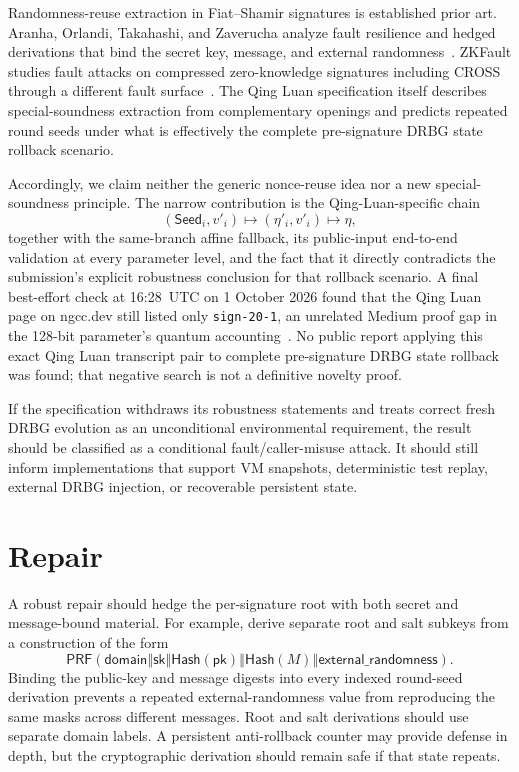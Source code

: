 \documentclass[11pt,a4paper]{article}
\newcommand{\concat}{\mathbin\Vert}
\newcommand{\pk}{\ensuremath{\mathsf{pk}}}
\newcommand{\sk}{\ensuremath{\mathsf{sk}}}
\newcommand{\Hash}{\ensuremath{\mathsf{Hash}}}
\begin{document}
Randomness-reuse extraction in Fiat--Shamir signatures is established prior
art.  Aranha, Orlandi, Takahashi, and Zaverucha analyze fault resilience and
hedged derivations that bind the secret key, message, and external
randomness~\cite{aranha-hedged}.  ZKFault studies fault attacks on compressed
zero-knowledge signatures including CROSS through a different fault
surface~\cite{zkfault}.  The Qing Luan specification itself describes
special-soundness extraction from complementary openings and predicts repeated
round seeds under what is effectively the complete pre-signature DRBG state
rollback scenario.

Accordingly, we claim neither the generic nonce-reuse idea nor a new
special-soundness principle.  The narrow contribution is the
Qing-Luan-specific chain
\[
 (\mathsf{Seed}_i,v'_i)\longmapsto(\eta'_i,v'_i)
        \longmapsto\eta,
\]
together with the same-branch affine fallback, its public-input end-to-end
validation at every parameter level, and the fact that it directly contradicts
the submission's explicit robustness conclusion for that rollback scenario.
A final best-effort check at 16:28~UTC on 1 October 2026 found that the Qing
Luan page on ngcc.dev still listed only \texttt{sign-20-1}, an unrelated Medium
proof gap in the 128-bit parameter's quantum accounting~\cite{ngcc-qingluan}.
No public report applying this exact Qing Luan transcript pair to complete
pre-signature DRBG state rollback was found; that negative search is not a
definitive novelty proof.

If the specification withdraws its robustness statements and treats correct
fresh DRBG evolution as an unconditional environmental requirement, the result
should be classified as a conditional fault/caller-misuse attack.  It should
still inform implementations that support VM snapshots, deterministic test
replay, external DRBG injection, or recoverable persistent state.

\section{Repair}

A robust repair should hedge the per-signature root with both secret and
message-bound material.  For example, derive separate root and salt subkeys
from a construction of the form
\[
 \mathsf{PRF}(\mathsf{domain}\concat\sk\concat\Hash(\pk)
              \concat\Hash(M)\concat\mathsf{external\_randomness}).
\]
Binding the public-key and message digests into every indexed round-seed
derivation prevents a repeated external-randomness value from reproducing the
same masks across different messages.  Root and salt derivations should use
separate domain labels.  A persistent anti-rollback counter may provide
defense in depth, but the cryptographic derivation should remain safe if that
state repeats.
\end{document}
